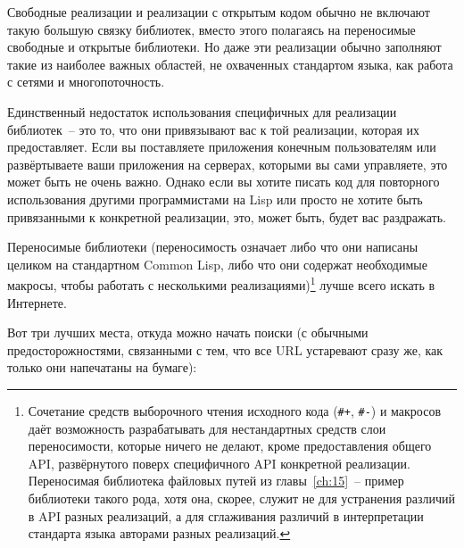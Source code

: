 Свободные реализации и реализации с открытым кодом обычно не включают такую большую связку
библиотек, вместо этого полагаясь на переносимые свободные и открытые библиотеки. Но даже
эти реализации обычно заполняют такие из наиболее важных областей, не охваченных
стандартом языка, как работа с сетями и многопоточность.

Единственный недостаток использования специфичных для реализации библиотек~-- это то, что
они привязывают вас к той реализации, которая их предоставляет. Если вы поставляете
приложения конечным пользователям или развёртываете ваши приложения на серверах, которыми
вы сами управляете, это может быть не очень важно. Однако если вы хотите писать код для
повторного использования другими программистами на Lisp или просто не хотите быть
привязанными к конкретной реализации, это, может быть, будет вас раздражать.

Переносимые библиотеки (переносимость означает либо что они написаны целиком на
стандартном Common Lisp, либо что они содержат необходимые макросы, чтобы работать с
несколькими реализациями)\footnote{Сочетание средств выборочного чтения исходного кода
  (\lstinline!#+!, \lstinline!#-!) и макросов даёт возможность разрабатывать для
  нестандартных средств слои переносимости, которые ничего не делают, кроме предоставления
  общего API, развёрнутого поверх специфичного API конкретной реализации. Переносимая
  библиотека файловых путей из главы~\ref{ch:15}~-- пример библиотеки такого рода, хотя
  она, скорее, служит не для устранения различий в API разных реализаций, а для сглаживания
  различий в интерпретации стандарта языка авторами разных реализаций.}\hspace{\footnotenegspace} лучше всего искать
в Интернете.

Вот три лучших места, откуда можно начать поиски (с обычными предосторожностями,
связанными с тем, что все URL устаревают сразу же, как только они напечатаны на бумаге):

